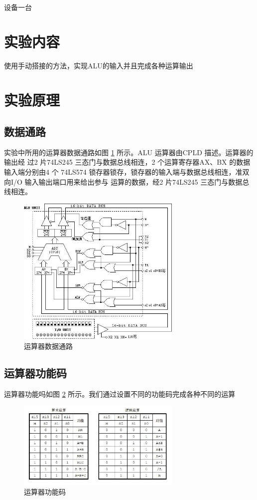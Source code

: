 \documentclass[a4paper,10pt,UTF8]{paper}
\numberwithin{equation}{section}
\numberwithin{figure}{section}
\begin{document}
\dai 设备一台

\section{实验内容}

使用手动搭接的方法，实现ALU的输入并且完成各种运算输出

\section{实验原理}

\subsection{数据通路}

实验中所用的运算器数据通路如图 \ref{fig:datapath} 所示。ALU 运算器由CPLD 描述。运算器的输出经
过2 片74LS245 三态门与数据总线相连，2 个运算寄存器AX、BX 的数据输入端分别由4 个
74LS574 锁存器锁存，锁存器的输入端与数据总线相连，准双向I/O 输入输出端口用来给出参与
运算的数据，经2 片74LS245 三态门与数据总线相连。


\begin{figure}[h]
  \centering
  \includegraphics[width=0.7\textwidth]{1.jpg}
  \caption{运算器数据通路}
  \label{fig:datapath}
\end{figure}

\subsection{运算器功能码}

运算器功能吗如图 \ref{fig:funcode} 所示。我们通过设置不同的功能码完成各种不同的运算

\begin{figure}[h]
  \centering
  \includegraphics[width=0.7\textwidth]{2.JPG}
  \caption{运算器功能码}
  \label{fig:funcode}
\end{figure}
\end{document}
